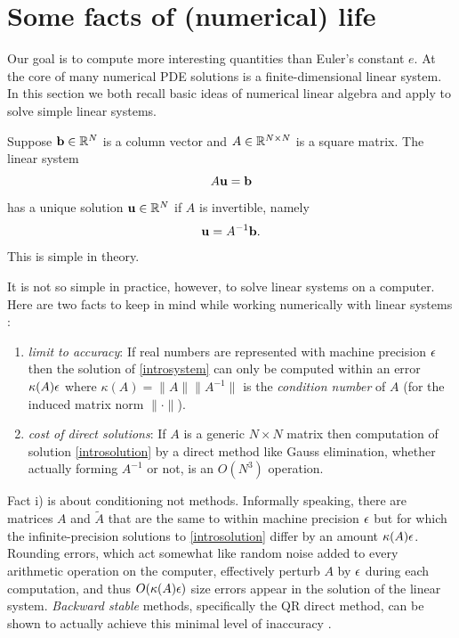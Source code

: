 
\section{Some facts of (numerical) life}

Our goal is to compute more interesting quantities than Euler's constant $e$.  At the core of many numerical PDE solutions is a finite-dimensional linear system.  In this section we both recall basic ideas of numerical linear algebra and apply \PETSc to solve simple linear systems.

Suppose $\mathbf{b}\in \mathbb{R}^{N}$ is a column vector and $A\in\mathbb{R}^{N\times N}$ is a square matrix.  The linear system
\begin{equation}
A \mathbf{u} = \mathbf{b} \label{introsystem}
\end{equation}
has a unique solution $\mathbf{u}\in \mathbb{R}^{N}$ if $A$ is invertible, namely
\begin{equation}
\mathbf{u} = A^{-1} \mathbf{b}. \label{introsolution}
\end{equation}
This is simple in theory.

It is not so simple in practice, however, to solve linear systems on a computer.  Here are two facts to keep in mind while working numerically with linear systems \citep{TrefethenBau1997}:
\renewcommand{\labelenumi}{\roman{enumi})}
\begin{enumerate}
\item \label{limittoaccuracy} \emph{limit to accuracy}:  If real numbers are represented with machine precision $\epsilon$ then the solution of \eqref{introsystem} can only be computed within an error $\kappa(A) \epsilon$ where $\kappa(A) = \|A\| \|A^{-1}\|$ is the \emph{condition number} of $A$ (for the induced matrix norm $\|\cdot\|$).
\item \emph{cost of direct solutions}:  If $A$ is a generic $N\times N$ matrix then computation of solution \eqref{introsolution} by a direct method like Gauss elimination, whether actually forming $A^{-1}$ or not, is an $O(N^3)$ operation.
\end{enumerate}

Fact i) is about conditioning not methods.  Informally speaking, there are matrices $A$ and $\tilde A$ that are the same to within machine precision $\epsilon$ but for which the infinite-precision solutions to \eqref{introsolution} differ by an amount $\kappa(A) \epsilon$.  Rounding errors, which act somewhat like random noise added to every arithmetic operation on the computer, effectively perturb $A$ by $\epsilon$ during each computation, and thus $O(\kappa(A) \epsilon)$ size errors appear in the solution of the linear system.  \emph{Backward stable} methods, specifically the QR direct method, can be shown to actually achieve this minimal level of inaccuracy \citep{TrefethenBau1997}.

